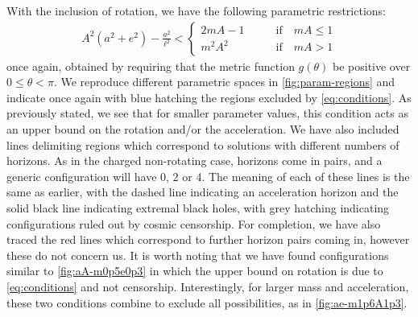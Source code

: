\documentclass[
twoside,
openright,
frontopenright
]{dmathesis}
\begin{document}
With the inclusion of rotation, we have the following parametric restrictions:
\begin{align}
  \label{eq:conditions}
  A^2(a^2+e^2)-\frac{a^2}{\ell^2} <
  \begin{cases}
    2mA - 1 \qquad &\mbox{if} \quad mA \leqslant 1\\
    m^2A^2 \qquad &\mbox{if} \quad mA > 1
  \end{cases}
\end{align}
once again, obtained by requiring that the metric function $g(\theta)$ be
positive over $0\leqslant\theta<\pi$. We reproduce different parametric spaces
in \cref{fig:param-regions} and indicate once again with blue hatching the
regions excluded by \cref{eq:conditions}. As previously stated, we see that for
smaller parameter values, this condition acts as an upper bound on the rotation
and/or the acceleration. We have also included lines delimiting regions which
correspond to solutions with different numbers of horizons. As in the charged
non-rotating case, horizons come in pairs, and a generic configuration will have
0, 2 or 4. The meaning of each of these lines is the same as earlier, with the
dashed line indicating an acceleration horizon and the solid black line
indicating extremal black holes, with grey hatching indicating configurations
ruled out by cosmic censorship. For completion, we have also traced the red
lines which correspond to further horizon pairs coming in, however these do not
concern us. It is worth noting that we have found configurations similar to
\cref{fig:aA-m0p5e0p3} in which the upper bound on rotation is due to
\cref{eq:conditions} and not censorship. Interestingly, for larger mass and
acceleration, these two conditions combine to exclude all possibilities, as in
\cref{fig:ae-m1p6A1p3}. 
\end{document}

